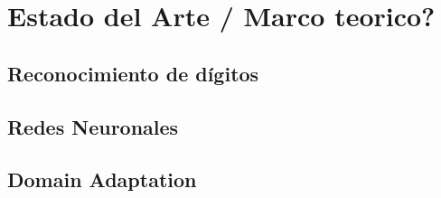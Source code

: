 \chapter{Estado del Arte / Marco teorico?}

\label{Chapter2}

\section{Reconocimiento de d\'igitos}

\lipsum[1]

\section{Redes Neuronales}

\lipsum[1]

\section{Domain Adaptation}

\lipsum[1]